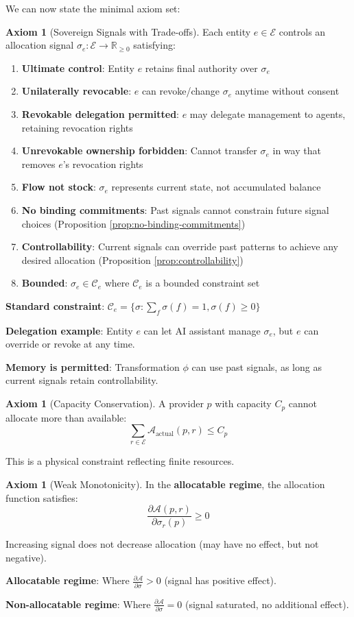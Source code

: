 \documentclass[11pt,a4paper]{article}
\theoremstyle{definition}
\newtheorem{axiom}[theorem]{Axiom}
\theoremstyle{remark}
\newcommand{\E}{\mathcal{E}}
\newcommand{\A}{\mathcal{A}}
\newcommand{\C}{\mathcal{C}}
\begin{document}
We can now state the minimal axiom set:

\begin{axiom}[Sovereign Signals with Trade-offs]
\label{ax:sovereignty}
Each entity $e \in \E$ controls an allocation signal $\sigma_e: \E \to \mathbb{R}_{\ge 0}$ satisfying:
\begin{enumerate}
\item \textbf{Ultimate control}: Entity $e$ retains final authority over $\sigma_e$
\item \textbf{Unilaterally revocable}: $e$ can revoke/change $\sigma_e$ anytime without consent
\item \textbf{Revokable delegation permitted}: $e$ may delegate management to agents, retaining revocation rights
\item \textbf{Unrevokable ownership forbidden}: Cannot transfer $\sigma_e$ in way that removes $e$'s revocation rights
\item \textbf{Flow not stock}: $\sigma_e$ represents current state, not accumulated balance
\item \textbf{No binding commitments}: Past signals cannot constrain future signal choices (Proposition \ref{prop:no-binding-commitments})
\item \textbf{Controllability}: Current signals can override past patterns to achieve any desired allocation (Proposition \ref{prop:controllability})
\item \textbf{Bounded}: $\sigma_e \in \C_e$ where $\C_e$ is a bounded constraint set
\end{enumerate}

\textbf{Standard constraint}: $\C_e = \{\sigma : \sum_f \sigma(f) = 1, \sigma(f) \ge 0\}$

\textbf{Delegation example}: Entity $e$ can let AI assistant manage $\sigma_e$, but $e$ can override or revoke at any time.

\textbf{Memory is permitted}: Transformation $\phi$ can use past signals, as long as current signals retain controllability.
\end{axiom}

\begin{axiom}[Capacity Conservation]
\label{ax:conservation}
A provider $p$ with capacity $C_p$ cannot allocate more than available:
\[ \sum_{r \in \E} \A_{\text{actual}}(p,r) \le C_p \]

This is a physical constraint reflecting finite resources.
\end{axiom}

\begin{axiom}[Weak Monotonicity]
\label{ax:monotonicity}
In the \textbf{allocatable regime}, the allocation function satisfies:
\[ \frac{\partial \A(p,r)}{\partial \sigma_r(p)} \ge 0 \]

Increasing signal does not decrease allocation (may have no effect, but not negative).

\textbf{Allocatable regime}: Where $\frac{\partial \A}{\partial \sigma} > 0$ (signal has positive effect).

\textbf{Non-allocatable regime}: Where $\frac{\partial \A}{\partial \sigma} = 0$ (signal saturated, no additional effect).
\end{axiom}
\end{document}
